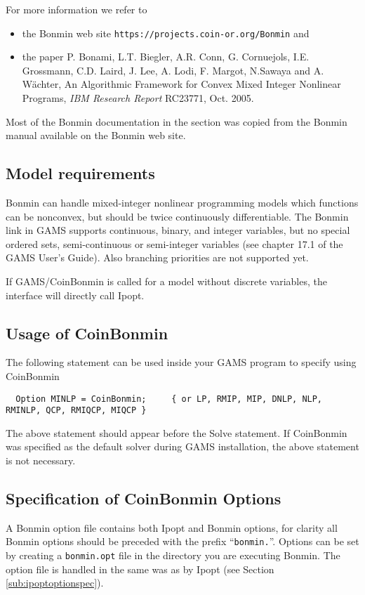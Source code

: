 For more information we refer to
\begin{itemize}
\item the Bonmin web site \texttt{https://projects.coin-or.org/Bonmin} and
\item the paper P. Bonami, L.T. Biegler, A.R. Conn, G. Cornuejols, I.E. Grossmann, C.D. Laird, J. Lee, A. Lodi, F. Margot, N.Sawaya and A. W\"achter, An Algorithmic Framework for Convex Mixed Integer Nonlinear Programs, \emph{IBM Research Report} RC23771, Oct. 2005.
\end{itemize}
Most of the Bonmin documentation in the section was copied from the Bonmin manual available on the Bonmin web site.

\subsection{Model requirements}

Bonmin can handle mixed-integer nonlinear programming models which functions can be nonconvex, but should be twice continuously differentiable.
The Bonmin link in GAMS supports continuous, binary, and integer variables, but no special ordered sets, semi-continuous or semi-integer variables (see chapter 17.1 of the GAMS User's Guide).
Also branching priorities are not supported yet.

If GAMS/CoinBonmin is called for a model without discrete variables, the interface will directly call Ipopt.

\subsection{Usage of CoinBonmin}

The following statement can be used inside your GAMS program to specify using CoinBonmin
\begin{verbatim}
  Option MINLP = CoinBonmin;     { or LP, RMIP, MIP, DNLP, NLP, RMINLP, QCP, RMIQCP, MIQCP }
\end{verbatim}

The above statement should appear before the Solve statement.
If CoinBonmin was specified as the default solver during GAMS installation, the above statement is not necessary.

\subsection{Specification of CoinBonmin Options}
\label{sub:bonminoptionspec}

A Bonmin option file contains both Ipopt and Bonmin options, for clarity all Bonmin options should be preceded with the prefix ``\texttt{bonmin.}''.
Options can be set by creating a \texttt{bonmin.opt} file in the directory you are executing Bonmin.
The option file is handled in the same was as by Ipopt (see Section \ref{sub:ipoptoptionspec}).

